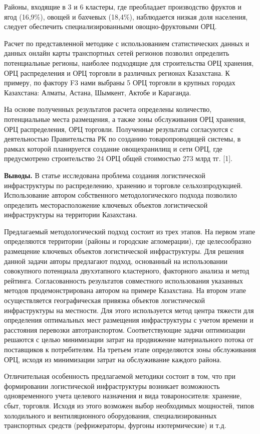Районы, входящие в 3 и 6 кластеры, где преобладает производство фруктов
и ягод (16,9\%), овощей и бахчевых (18,4\%), наблюдается низкая доля
населения, следует обеспечить специализированными овощно-фруктовыми ОРЦ.

Расчет по представленной методике с использованием статистических данных
и данных онлайн карты транспортных сетей регионов позволил определить
потенциальные регионы, наиболее подходящие для строительства ОРЦ
хранения, ОРЦ распределения и ОРЦ торговли в различных регионах
Казахстана. К примеру, по фактору F3 нами выбраны 5 ОРЦ торговли в
крупных городах Казахстана: Алматы, Астана, Шымкент, Актобе и Караганда.

На основе полученных результатов расчета определены количество,
потенциальные места размещения, а также зоны обслуживания ОРЦ хранения,
ОРЦ распределения, ОРЦ торговли. Полученные результаты согласуются с
деятельностью Правительства РК по созданию товаропроводящей системы, в
рамках которой планируется создание овощехранилищ и сети ОРЦ, где
предусмотрено строительство 24 ОРЦ общей стоимостью 273 млрд тг.
{[}1{]}.

{\bfseries Выводы.} В статье исследована проблема создания логистической
инфраструктуры по распределению, хранению и торговле сельхозпродукцией.
Использование автором собственного методологического подхода позволило
определить месторасположение ключевых объектов логистической
инфраструктуры на территории Казахстана.

Предлагаемый методологический подход состоит из трех этапов. На первом
этапе определяются территории (районы и городские агломерации), где
целесообразно размещение ключевых объектов логистической инфраструктуры.
Для решения данной задачи авторы предлагают подход, основанный на
использовании совокупного потенциала двухэтапного кластерного,
факторного анализа и метод рейтинга. Согласованность результатов
совместного использования указанных методов продемонстрирована автором
на примере Казахстана. На втором этапе осуществляется географическая
привязка объектов логистической инфраструктуры на местности. Для этого
используется метод центра тяжести для определения оптимальных мест
размещения инфраструктуры с учетом времени и расстояния перевозки
автотранспортом. Соответствующие задачи оптимизации решаются с целью
минимизации затрат на продвижение материального потока от поставщиков к
потребителям. На третьем этапе определяются зоны обслуживания ОРЦ,
исходя из минимизации затрат на обслуживание каждого района.

Отличительная особенность предлагаемой методики состоит в том, что при
формировании логистической инфраструктуры возникает возможность
одновременного учета целевого назначения и вида товароносителя:
хранение, сбыт, торговля. Исходя из этого возможен выбор необходимых
мощностей, типов холодильного и вентиляционного оборудования,
специализированных транспортных средств (рефрижераторы, фургоны
изотермические) и т.д.

